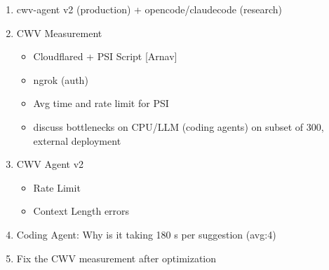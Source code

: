 \begin{enumerate}
    \item cwv-agent v2 (production) + opencode/claudecode (research) 

    \item CWV Measurement
    \begin{itemize}
        \item Cloudflared + PSI Script [Arnav] 
        \item ngrok (auth)
        \item Avg time and rate limit for PSI 
        \item discuss bottlenecks on CPU/LLM (coding agents) on subset of 300, external deployment
    \end{itemize}
    \item CWV Agent v2
    \begin{itemize}
        \item Rate Limit
        \item Context Length errors 
    \end{itemize}    
    \item Coding Agent: Why is it taking 180 s per suggestion (avg:4)
    \item Fix the CWV measurement after optimization
    

\end{enumerate}
